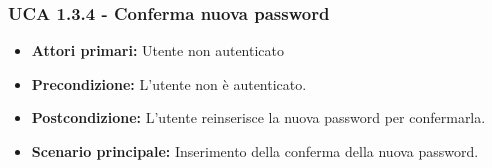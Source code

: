 \subsubsection{UCA 1.3.4 - Conferma nuova password}
\begin{itemize}
\item \textbf{Attori primari:} Utente non autenticato
\item \textbf{Precondizione:} L'utente non è autenticato.
\item \textbf{Postcondizione:} L'utente reinserisce la nuova password per confermarla.
\item \textbf{Scenario principale:} Inserimento della conferma della nuova password.
\end{itemize}